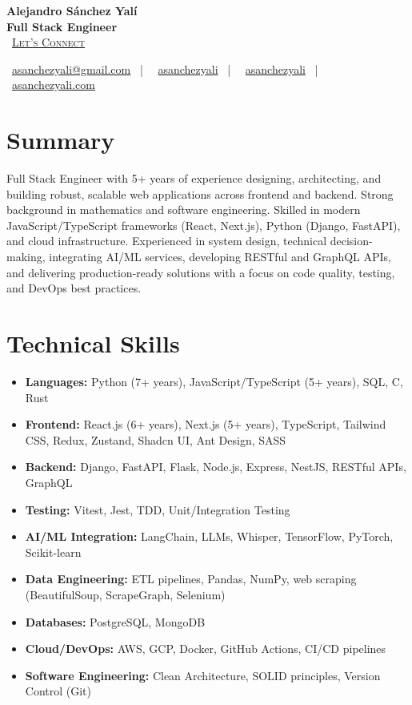 \documentclass[letterpaper,11pt]{article}
\newcommand{\normalfaCalendar}{{\mdseries\faCalendar}}
\newcommand{\normalfaEnvelope}{{\mdseries\faEnvelope}}
\newcommand{\normalfaLinkedin}{{\mdseries\faLinkedin}}
\newcommand{\normalfaGithub}{{\mdseries\faGithub}}
\newcommand{\normalfaGlobe}{{\mdseries\faGlobe}}
\begin{document}
\begin{center}
\textbf{\Huge Alejandro Sánchez Yalí}\\[0.2em]
\textbf{\Large Full Stack Engineer}\\[0.4em]
\small
\normalfaCalendar\ \href{https://cal.com/asanchezyali/full-time-opportunities}{\textsc{Let's Connect}}

\vspace{0.8em}
\normalfaEnvelope\ \href{mailto:asanchezyali@gmail.com}{asanchezyali@gmail.com}  ~|~
\normalfaLinkedin\ \href{https://www.linkedin.com/in/asanchezyali}{asanchezyali} ~|~
\normalfaGithub\ \href{https://github.com/asanchezyali}{asanchezyali}  ~|~
\normalfaGlobe\ \href{https://asanchezyali.com}{asanchezyali.com}
\end{center}

\section{Summary}
Full Stack Engineer with 5+ years of experience designing, architecting, and building robust, scalable web applications across frontend and backend. Strong background in mathematics and software engineering. Skilled in modern JavaScript/TypeScript frameworks (React, Next.js), Python (Django, FastAPI), and cloud infrastructure. Experienced in system design, technical decision-making, integrating AI/ML services, developing RESTful and GraphQL APIs, and delivering production-ready solutions with a focus on code quality, testing, and DevOps best practices.

\section{Technical Skills}
\begin{itemize}[leftmargin=*, itemsep=0pt]
  \item \textbf{Languages:} Python (7+ years), JavaScript/TypeScript (5+ years), SQL, C, Rust
  \item \textbf{Frontend:} React.js (6+ years), Next.js (5+ years), TypeScript, Tailwind CSS, Redux, Zustand, Shadcn UI, Ant Design, SASS
  \item \textbf{Backend:} Django, FastAPI, Flask, Node.js, Express, NestJS, RESTful APIs, GraphQL
  \item \textbf{Testing:} Vitest, Jest, TDD, Unit/Integration Testing
  \item \textbf{AI/ML Integration:} LangChain, LLMs, Whisper, TensorFlow, PyTorch, Scikit-learn
  \item \textbf{Data Engineering:} ETL pipelines, Pandas, NumPy, web scraping (BeautifulSoup, ScrapeGraph, Selenium)
  \item \textbf{Databases:} PostgreSQL, MongoDB
  \item \textbf{Cloud/DevOps:} AWS, GCP, Docker, GitHub Actions, CI/CD pipelines
  \item \textbf{Software Engineering:} Clean Architecture, SOLID principles, Version Control (Git)
\end{itemize}
\end{document}
